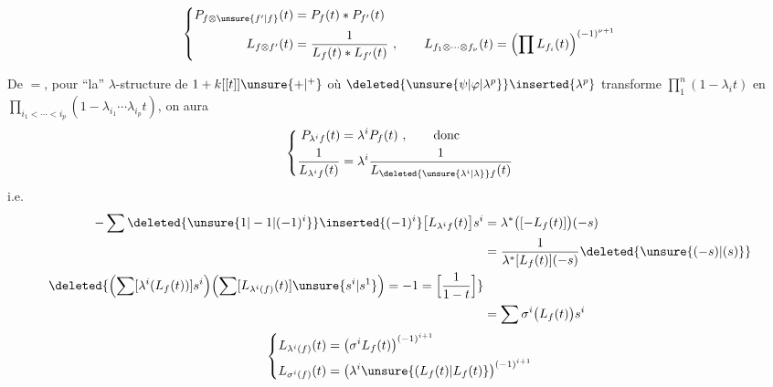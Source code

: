 \[
\left\{\begin{aligned}
P_{f\otimes\unsure{f'|f}}(t)&=P_f(t)\ast P_{f'}(t)\\
L_{f\otimes f'}(t)&=\frac{1}{L_f(t)\ast L_{f'}(t)}\ ,\qquad
L_{f_1\otimes\cdots\otimes f_\nu}(t)=\left(\prod L_{f_i}(t)\right)^{(-1)^{\nu+1}}
\end{aligned}\right.
\]

De $=$, pour ``la'' $\lambda$-structure de $1+k[[t]]\unsure{+|{}^{+}}$ où $\deleted{\unsure{\psi|\varphi|\lambda^p}}\inserted{\lambda^p}$ transforme $\prod_{1}^{n}(1-\lambda_i t)$ en $\prod_{i_1<\cdots<i_p}(1-\lambda_{i_1}\cdots\lambda_{i_p}t)$, on aura
\[
\left\{\begin{aligned}
P_{\lambda^i f}(t)&=\lambda^i P_f(t)\ ,\qquad\text{donc}\\
\frac{1}{L_{\lambda^i f}(t)}&=\lambda^i\frac{1}{L_{\deleted{\unsure{\lambda^i|\lambda}}f}(t)}
\end{aligned}\right.
\]
i.e.
\[
\begin{aligned}
-\sum\deleted{\unsure{1|-1|(-1)^i}}\inserted{(-1)^i}\bigl[L_{\lambda^i f}(t)\bigr]s^i
 &=\lambda^\ast\bigl([-L_f(t)]\bigr)(-s)\\
 &=\frac{1}{\lambda^\ast[L_f(t)](-s)}\deleted{\unsure{(-s)|(s)}}\\
\deleted{\Bigl(\sum[\lambda^i(L_f(t))]s^i\Bigr)\Bigl(\sum[L_{\lambda^i(f)}(t)]\unsure{s^i|s^1}\Bigr)=-1=\Bigl[\frac{1}{1-t}\Bigr]}&\\
 &=\sum\sigma^i\bigl(L_f(t)\bigr)s^i
\end{aligned}
\]
\[
\left\{\begin{aligned}
L_{\lambda^i(f)}(t)&=\bigl(\sigma^i L_f(t)\bigr)^{(-1)^{i+1}}\\
L_{\sigma^i(f)}(t)&=\bigl(\lambda^i\unsure{(L_f(t)|L_f(t)}\bigr)^{(-1)^{i+1}}
\end{aligned}\right.
\]

